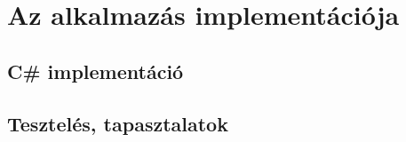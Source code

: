 \chapter{Az alkalmazás implementációja}
\section{C\# implementáció}


\section{Tesztelés, tapasztalatok}

